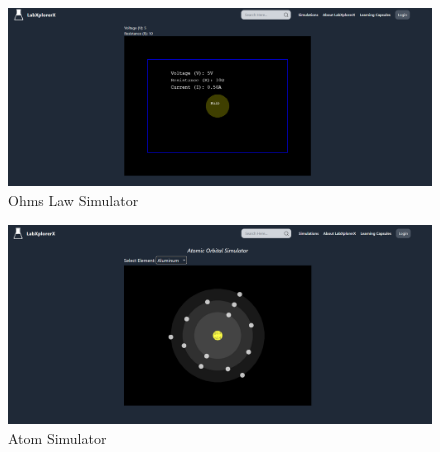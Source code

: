  \begin{figure}[H]
    \centering
     \includegraphics[width = 16cm]{Diagrams/output/ohms.png}
     \caption{Ohms Law Simulator}
 \end{figure}

 \begin{figure}[H]
    \centering
     \includegraphics[width = 16cm]{Diagrams/output/atom.png}
     \caption{Atom Simulator}
 \end{figure}

